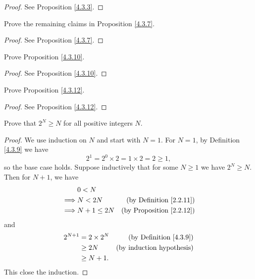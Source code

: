 \begin{proof}
    See Proposition \ref{4.3.3}.
\end{proof}

\begin{exercise}\label{ex 4.3.2}
    Prove the remaining claims in Proposition \ref{4.3.7}.
\end{exercise}

\begin{proof}
    See Proposition \ref{4.3.7}.
\end{proof}

\begin{exercise}\label{ex 4.3.3}
    Prove Proposition \ref{4.3.10}.
\end{exercise}

\begin{proof}
    See Proposition \ref{4.3.10}.
\end{proof}

\begin{exercise}
    Prove Proposition \ref{4.3.12}.
\end{exercise}

\begin{proof}
    See Proposition \ref{4.3.12}.
\end{proof}

\begin{exercise}\label{ex 4.3.5}
    Prove that \(2^N \geq N\) for all positive integers \(N\).
\end{exercise}

\begin{proof}
    We use induction on \(N\) and start with \(N = 1\).
    For \(N = 1\), by Definition \ref{4.3.9} we have
    \[
        2^1 = 2^0 \times 2 = 1 \times 2 = 2 \geq 1,
    \]
    so the base case holds.
    Suppose inductively that for some \(N \geq 1\) we have \(2^N \geq N\).
    Then for \(N + 1\), we have
    \begin{align*}
                 & 0 < N                                                \\
        \implies & N < 2N        & \text{(by Definition \ref{2.2.11})}  \\
        \implies & N + 1 \leq 2N & \text{(by Proposition \ref{2.2.12})}
    \end{align*}
    and
    \begin{align*}
        2^{N + 1} & = 2 \times 2^N & \text{(by Definition \ref{4.3.9})} \\
                  & \geq 2N        & \text{(by induction hypothesis)}   \\
                  & \geq N + 1.
    \end{align*}
    This close the induction.
\end{proof}